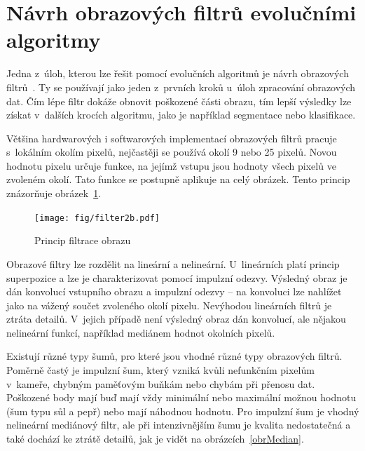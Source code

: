 \section{Návrh obrazových filtrů evolučními algoritmy}
\label{secIF}

Jedna z~úloh, kterou lze řešit pomocí evolučních algoritmů je návrh obrazových filtrů~\cite{ZelenaIF}. Ty se používají jako jeden z~prvních kroků u~úloh zpracování obrazových dat. Čím lépe filtr dokáže obnovit poškozené části obrazu, tím lepší výsledky lze získat v~dalších krocích algoritmu, jako je například segmentace nebo klasifikace.

Většina hardwarových i softwarových implementací obrazových filtrů pracuje s~lokálním okolím pixelů, nejčastěji se používá okolí 9 nebo 25 pixelů. Novou hodnotu pixelu určuje funkce, na jejímž vstupu jsou hodnoty všech pixelů ve zvoleném okolí. Tato funkce se postupně aplikuje na celý obrázek. Tento princip znázorňuje obrázek~\ref{obrIFokoli}.

\begin{figure}[htb]
    \centering\texttt{[image: fig/filter2b.pdf]}
    \caption{Princip filtrace obrazu}
    \label{obrIFokoli}
\end{figure}

Obrazové filtry lze rozdělit na lineární a nelineární. U~lineárních platí princip superpozice a lze je charakterizovat pomocí impulzní odezvy. Výsledný obraz je dán konvolucí vstupního obrazu a impulzní odezvy -- na konvoluci lze nahlížet jako na vážený součet zvoleného okolí pixelu. Nevýhodou lineárních filtrů je ztráta detailů. V~jejich případě není výsledný obraz dán konvolucí, ale nějakou nelineární funkcí, například mediánem hodnot okolních pixelů.

Existují různé typy šumů, pro které jsou vhodné různé typy obrazových filtrů. Poměrně častý je impulzní šum, který vzniká kvůli nefunkčním pixelům v~kameře, chybným paměťovým buňkám nebo chybám při přenosu dat. Poškozené body mají buď mají vždy minimální nebo maximální možnou hodnotu (šum typu sůl a pepř) nebo mají náhodnou hodnotu. Pro impulzní šum je vhodný nelineární mediánový filtr, ale při intenzivnějším šumu je kvalita nedostatečná a také dochází ke ztrátě detailů, jak je vidět na obrázcích~\ref{obrMedian}.

